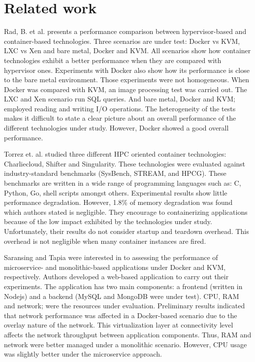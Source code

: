 \section{\label{sec:trabajo-relacionado} Related work}
Rad, B. et al. \cite{rad2017introduction} presents a performance comparison between hypervisor-based and container-based technologies. 
Three scenarios are under test: Docker vs KVM, LXC vs Xen and bare metal, Docker and KVM. 
All scenarios show how container technologies exhibit a better performance when they are compared with hypervisor ones. 
Experiments with Docker also show how its performance is close to the bare metal environment.
Those experiments were not homogeneous. 
When Docker was compared with KVM, an image processing test was carried out. 
The LXC and Xen scenario run SQL queries.
And bare metal, Docker and KVM; employed reading and writing I/O operations.
The heterogeneity of the tests makes it difficult to state a clear picture about an overall performance of the different technologies under study.
However, Docker showed a good overall performance.

Torrez et. al. \cite{torrez2019hpc} studied three different HPC oriented container technologies: Charliecloud, Shifter and Singularity.
These technologies were evaluated against industry-standard benchmarks (SysBench,  STREAM,  and  HPCG).
These benchmarks are written in a wide range of programming languages such as: C, Python, Go, shell scripts amongst others.
Experimental results show little performance degradation. 
However, 1.8\% of memory degradation was found which authors stated is negligible. 
They encourage to containerizing applications because of the low impact exhibited by the technologies under study.
Unfortunately, their results do not consider startup and teardown overhead. 
This overhead is not negligible when many container instances are fired.

Saransing and Tapia \cite{saransig2018performance} were interested in to assessing the performance of microservice- and monolithic-based applications under Docker and KVM, respectively. 
Authors developed a web-based application to carry out their experiments.
The application has two main components: a frontend (written in Nodejs) and a backend (MySQL and MongoDB were under test).
CPU, RAM and network; were the resources under evaluation.
Preliminary results indicated that network performance was affected in a Docker-based scenario due to the overlay nature of the network.
This virtualization layer at connectivity level affects the network throughput between application components.
Thus, RAM and network were better managed under a monolithic scenario.
However, CPU usage was slightly better under the microservice approach.

